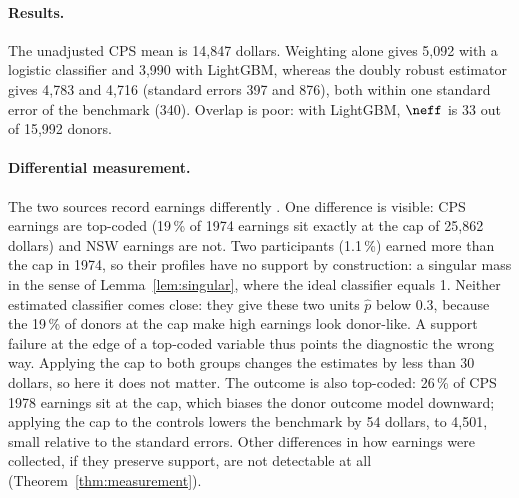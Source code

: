 \paragraph{Results.} The unadjusted CPS mean is 14{,}847 dollars. Weighting alone gives 5{,}092 with a logistic classifier and 3{,}990 with LightGBM, whereas the doubly robust estimator gives 4{,}783 and 4{,}716 (standard errors 397 and 876), both within one standard error of the benchmark (340). Overlap is poor: with LightGBM, $\neff$ is 33 out of 15{,}992 donors.

\paragraph{Differential measurement.} The two sources record earnings differently \citep{smith2005}. One difference is visible: CPS earnings are top-coded (19\,\% of 1974 earnings sit exactly at the cap of 25{,}862 dollars) and NSW earnings are not. Two participants (1.1\,\%) earned more than the cap in 1974, so their profiles have no support by construction: a singular mass in the sense of Lemma~\ref{lem:singular}, where the ideal classifier equals 1. Neither estimated classifier comes close: they give these two units $\hat p$ below 0.3, because the 19\,\% of donors at the cap make high earnings look donor-like. A support failure at the edge of a top-coded variable thus points the diagnostic the wrong way. Applying the cap to both groups changes the estimates by less than 30 dollars, so here it does not matter. The outcome is also top-coded: 26\,\% of CPS 1978 earnings sit at the cap, which biases the donor outcome model downward; applying the cap to the controls lowers the benchmark by 54 dollars, to 4{,}501, small relative to the standard errors. Other differences in how earnings were collected, if they preserve support, are not detectable at all (Theorem~\ref{thm:measurement}).
